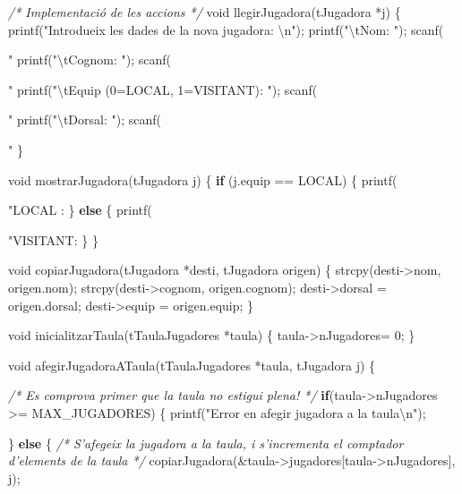 \documentclass[]{book}
\newenvironment{Shaded}{\begin{snugshade}}{\end{snugshade}}
\newcommand{\DataTypeTok}[1]{\textcolor[rgb]{0.13,0.29,0.53}{#1}}
\newcommand{\DecValTok}[1]{\textcolor[rgb]{0.00,0.00,0.81}{#1}}
\newcommand{\SpecialCharTok}[1]{\textcolor[rgb]{0.00,0.00,0.00}{#1}}
\newcommand{\StringTok}[1]{\textcolor[rgb]{0.31,0.60,0.02}{#1}}
\newcommand{\CommentTok}[1]{\textcolor[rgb]{0.56,0.35,0.01}{\textit{#1}}}
\newcommand{\ControlFlowTok}[1]{\textcolor[rgb]{0.13,0.29,0.53}{\textbf{#1}}}
\newcommand{\NormalTok}[1]{#1}
\begin{document}
\begin{Shaded}
\begin{Highlighting}[]
{{\CommentTok{/* Implementació de les accions */}
\DataTypeTok{void}\NormalTok{ llegirJugadora(tJugadora *j) \{}
\NormalTok{    printf(}\StringTok{"Introdueix les dades de la nova jugadora: }\SpecialCharTok{\textbackslash{}n}\StringTok{"}\NormalTok{);}
\NormalTok{    printf(}\StringTok{"}\SpecialCharTok{\textbackslash{}t}\StringTok{Nom: "}\NormalTok{);}
\NormalTok{    scanf(}\StringTok{"%
\NormalTok{    printf(}\StringTok{"}\SpecialCharTok{\textbackslash{}t}\StringTok{Cognom: "}\NormalTok{);}
\NormalTok{    scanf(}\StringTok{"%
\NormalTok{    printf(}\StringTok{"}\SpecialCharTok{\textbackslash{}t}\StringTok{Equip (0=LOCAL, 1=VISITANT): "}\NormalTok{);}
\NormalTok{    scanf(}\StringTok{"%
\NormalTok{    printf(}\StringTok{"}\SpecialCharTok{\textbackslash{}t}\StringTok{Dorsal: "}\NormalTok{);}
\NormalTok{    scanf(}\StringTok{"%
\NormalTok{\}}

\DataTypeTok{void}\NormalTok{ mostrarJugadora(tJugadora j) \{}
    \ControlFlowTok{if}\NormalTok{ (j.equip == LOCAL) \{}
\NormalTok{        printf(}\StringTok{"LOCAL   : %
\NormalTok{    \} }\ControlFlowTok{else}\NormalTok{ \{}
\NormalTok{        printf(}\StringTok{"VISITANT: %
\NormalTok{    \}}
\NormalTok{\}}

\DataTypeTok{void}\NormalTok{ copiarJugadora(tJugadora *desti, tJugadora origen) \{}
\NormalTok{    strcpy(desti->nom, origen.nom);}
\NormalTok{    strcpy(desti->cognom, origen.cognom);}
\NormalTok{    desti->dorsal = origen.dorsal;}
\NormalTok{    desti->equip = origen.equip;}
\NormalTok{\}}

\DataTypeTok{void}\NormalTok{ inicialitzarTaula(tTaulaJugadores *taula) \{    }
\NormalTok{    taula->nJugadores= }\DecValTok{0}\NormalTok{;}
\NormalTok{\}}

\DataTypeTok{void}\NormalTok{ afegirJugadoraATaula(tTaulaJugadores *taula, tJugadora j) \{}
    
    \CommentTok{/* Es comprova primer que la taula no estigui plena! */}
    \ControlFlowTok{if}\NormalTok{(taula->nJugadores >= MAX_JUGADORES) \{}
\NormalTok{        printf(}\StringTok{"Error en afegir jugadora a la taula}\SpecialCharTok{\textbackslash{}n}\StringTok{"}\NormalTok{);}
        
\NormalTok{    \} }\ControlFlowTok{else}\NormalTok{ \{}
        \CommentTok{/* S'afegeix la jugadora a la taula, i s'incrementa}
\CommentTok{           el comptador d'elements de la taula */}
\NormalTok{        copiarJugadora(&taula->jugadores[taula->nJugadores], j);}
        
}}}}}}}}
\end{Highlighting}
\end{Shaded}
\end{document}
